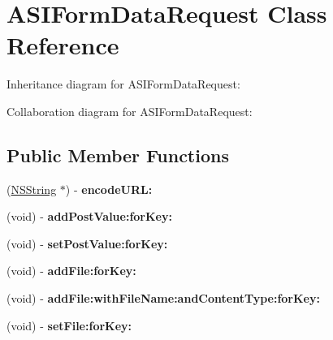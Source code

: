 \hypertarget{interface_a_s_i_form_data_request}{
\section{\-A\-S\-I\-Form\-Data\-Request \-Class \-Reference}
\label{interface_a_s_i_form_data_request}
}


\-Inheritance diagram for \-A\-S\-I\-Form\-Data\-Request\-:


\-Collaboration diagram for \-A\-S\-I\-Form\-Data\-Request\-:
\subsection*{\-Public \-Member \-Functions}
\begin{DoxyCompactItemize}
\item 
\hypertarget{interface_a_s_i_form_data_request_a817cf8f9da80c83539be0f3c9b8dc868}{
(\hyperlink{class_n_s_string}{\-N\-S\-String} $\ast$) -\/ {\bfseries encode\-U\-R\-L\-:}}
\label{interface_a_s_i_form_data_request_a817cf8f9da80c83539be0f3c9b8dc868}

\item 
\hypertarget{interface_a_s_i_form_data_request_af9571a143a9feeb009c33c458447aa98}{
(void) -\/ {\bfseries add\-Post\-Value\-:for\-Key\-:}}
\label{interface_a_s_i_form_data_request_af9571a143a9feeb009c33c458447aa98}

\item 
\hypertarget{interface_a_s_i_form_data_request_a90236e7099afbab72bb160029df5a368}{
(void) -\/ {\bfseries set\-Post\-Value\-:for\-Key\-:}}
\label{interface_a_s_i_form_data_request_a90236e7099afbab72bb160029df5a368}

\item 
\hypertarget{interface_a_s_i_form_data_request_afa340cd3b263a621a4f52015cdb8c568}{
(void) -\/ {\bfseries add\-File\-:for\-Key\-:}}
\label{interface_a_s_i_form_data_request_afa340cd3b263a621a4f52015cdb8c568}

\item 
\hypertarget{interface_a_s_i_form_data_request_ae413f676daaf869aa3cac76371466c16}{
(void) -\/ {\bfseries add\-File\-:with\-File\-Name\-:and\-Content\-Type\-:for\-Key\-:}}
\label{interface_a_s_i_form_data_request_ae413f676daaf869aa3cac76371466c16}

\item 
\hypertarget{interface_a_s_i_form_data_request_a8b097474a664290880231fd4439f352e}{
(void) -\/ {\bfseries set\-File\-:for\-Key\-:}}
\label{interface_a_s_i_form_data_request_a8b097474a664290880231fd4439f352e}


\end{DoxyCompactItemize}
